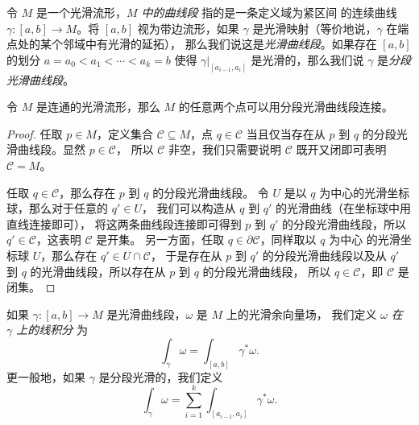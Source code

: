 \documentclass[fontset=none]{Notes}
\begin{document}
令 $M$ 是一个光滑流形，\emph{$M$ 中的曲线段} 指的是一条定义域为紧区间
的连续曲线 $\gamma:[a,b]\to M$。将 $[a,b]$ 视为带边流形，如果
$\gamma$ 是光滑映射（等价地说，$\gamma$ 在端点处的某个邻域中有光滑的延拓），
那么我们说这是\emph{光滑曲线段}。如果存在 $[a,b]$ 的划分 $a=a_0<a_1<\cdots<a_k=b$
使得 $\gamma|_{[a_{i-1},a_i]}$ 是光滑的，那么我们说 $\gamma$
是\emph{分段光滑曲线段}。

\begin{proposition}
  令 $M$ 是连通的光滑流形，那么 $M$ 的任意两个点可以用分段光滑曲线段连接。
\end{proposition}
\begin{proof}
  任取 $p\in M$，定义集合 $\mathcal{C}\subseteq M$，点 $q\in \mathcal{C}$
  当且仅当存在从 $p$ 到 $q$ 的分段光滑曲线段。显然 $p\in \mathcal{C}$，
  所以 $\mathcal{C}$ 非空，我们只需要说明 $\mathcal{C}$ 既开又闭即可表明
  $\mathcal{C}=M$。

  任取 $q\in \mathcal{C}$，那么存在 $p$ 到 $q$ 的分段光滑曲线段。
  令 $U$ 是以 $q$ 为中心的光滑坐标球，那么对于任意的 $q'\in U$，
  我们可以构造从 $q$ 到 $q'$ 的光滑曲线（在坐标球中用直线连接即可），
  将这两条曲线段连接即可得到 $p$ 到 $q'$ 的分段光滑曲线段，所以
  $q'\in \mathcal{C}$，这表明 $\mathcal{C}$ 是开集。
  另一方面，任取 $q\in\partial \mathcal{C}$，同样取以 $q$ 为中心
  的光滑坐标球 $U$，那么存在 $q'\in U\cap \mathcal{C}$，
  于是存在从 $p$ 到 $q'$ 的分段光滑曲线段以及从 $q'$ 到 $q$
  的光滑曲线段，所以存在从 $p$ 到 $q$ 的分段光滑曲线段，
  所以 $q\in \mathcal{C}$，即 $\mathcal{C}$ 是闭集。
\end{proof}

如果 $\gamma:[a,b]\to M$ 是光滑曲线段，$\omega$ 是 $M$ 上的光滑余向量场，
我们定义 \emph{$\omega$ 在 $\gamma$ 上的线积分} 为
\[
  \int_\gamma\omega=\int_{[a,b]}\gamma^*\omega.  
\]
更一般地，如果 $\gamma$ 是分段光滑的，我们定义
\[
    \int_\gamma\omega=\sum_{i=1}^k\int_{[a_{i-1},a_i]}\gamma^*\omega.
\]
\end{document}
